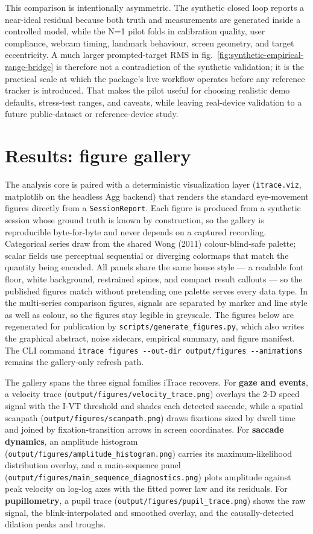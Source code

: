 \documentclass[
]{article}
\begin{document}
This comparison is intentionally asymmetric. The synthetic closed loop
reports a near-ideal residual because both truth and measurements are
generated inside a controlled model, while the N=1 pilot folds in
calibration quality, user compliance, webcam timing, landmark behaviour,
screen geometry, and target eccentricity. A much larger prompted-target
RMS in fig.~\ref{fig:synthetic-empirical-range-bridge} is therefore not
a contradiction of the synthetic validation; it is the practical scale
at which the package's live workflow operates before any reference
tracker is introduced. That makes the pilot useful for choosing
realistic demo defaults, stress-test ranges, and caveats, while leaving
real-device validation to a future public-dataset or reference-device
study.

\section{Results: figure gallery}\label{sec:gallery}

The analysis core is paired with a deterministic visualization layer
(\texttt{itrace.viz}, matplotlib on the headless Agg backend) that
renders the standard eye-movement figures directly from a
\texttt{SessionReport}. Each figure is produced from a synthetic session
whose ground truth is known by construction, so the gallery is
reproducible byte-for-byte and never depends on a captured recording.
Categorical series draw from the shared Wong (2011) colour-blind-safe
palette; scalar fields use perceptual sequential or diverging colormaps
that match the quantity being encoded. All panels share the same house
style --- a readable font floor, white background, restrained spines,
and compact result callouts --- so the published figures match without
pretending one palette serves every data type. In the multi-series
comparison figures, signals are separated by marker and line style as
well as colour, so the figures stay legible in greyscale. The figures
below are regenerated for publication by
\texttt{scripts/generate\_figures.py}, which also writes the graphical
abstract, noise sidecars, empirical summary, and figure manifest. The
CLI command
\texttt{itrace\ figures\ -\/-out-dir\ output/figures\ -\/-animations}
remains the gallery-only refresh path.

The gallery spans the three signal families iTrace recovers. For
\textbf{gaze and events}, a velocity trace
(\texttt{output/figures/velocity\_trace.png}) overlays the 2-D speed
signal with the I-VT threshold and shades each detected saccade, while a
spatial scanpath (\texttt{output/figures/scanpath.png}) draws fixations
sized by dwell time and joined by fixation-transition arrows in screen
coordinates. For \textbf{saccade dynamics}, an amplitude histogram
(\texttt{output/figures/amplitude\_histogram.png}) carries its
maximum-likelihood distribution overlay, and a main-sequence panel
(\texttt{output/figures/main\_sequence\_diagnostics.png}) plots
amplitude against peak velocity on log-log axes with the fitted power
law and its residuals. For \textbf{pupillometry}, a pupil trace
(\texttt{output/figures/pupil\_trace.png}) shows the raw signal, the
blink-interpolated and smoothed overlay, and the causally-detected
dilation peaks and troughs.
\end{document}
